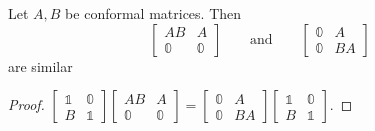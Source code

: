 \begin{lemma}
Let $A,B$ be conformal matrices. Then
\[ \begin{bmatrix}
AB & A \\ \mathbb{0} & \mathbb{0}
\end{bmatrix} \qquad\text{and}\qquad \begin{bmatrix}
\mathbb{0} & A \\ \mathbb{0} & BA
\end{bmatrix} \]
are similar
\end{lemma}
\begin{proof}
$\begin{bmatrix}
\mathbb{1} & \mathbb{0} \\ B & \mathbb{1}
\end{bmatrix}\begin{bmatrix}
AB & A \\ \mathbb{0} & \mathbb{0}
\end{bmatrix} = \begin{bmatrix}
\mathbb{0} & A \\ \mathbb{0} & BA
\end{bmatrix}\begin{bmatrix}
\mathbb{1} & \mathbb{0} \\ B & \mathbb{1}
\end{bmatrix}.$
\end{proof}


